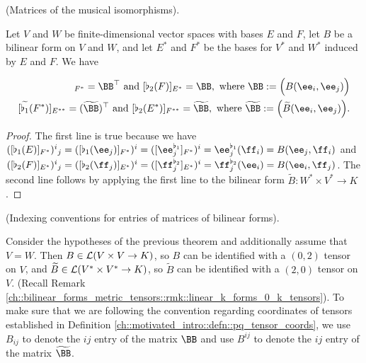 \begin{theorem}
\label{ch::bilinear_forms_metric_tensors::thm::matrices_musical_isos}
    (Matrices of the musical isomorphisms).
    
    Let $V$ and $W$ be finite-dimensional vector spaces with bases $E$ and $F$, let $B$ be a bilinear form on $V$ and $W$, and let $E^*$ and $F^*$ be the bases for $V^*$ and $W^*$ induced by $E$ and $F$. We have

    \begin{align*}
        [\flat_1(E)]_{F^*} = \BB^\top \text{ and } [\flat_2(F)]_{E^*} = \BB, \text{ where $\BB := \Big(B(\ee_i, \ee_j)\Big)$} \\
        [\widetilde{\flat_1}(F^*)]_{E^{**}} = (\widetilde{\BB})^\top \text{ and } [\flat_2(E^*)]_{F^{**}} = \widetilde{\BB}, \text{ where $\widetilde{\BB} := \Big(\widetilde{B}(\ee_i, \ee_j)\Big)$}. 
    \end{align*}
\end{theorem}

\begin{proof}
    The first line is true because we have $([\flat_1(E)]_{F^*})^i{}_j = ([\flat_1(\ee_j)]_{F^*})^i = ([\ee_j^{\flat_1}]_{F^*})^i = \ee_j^{\flat_1}(\ff_i) = B(\ee_j, \ff_i)$ and \\ $([\flat_2(F)]_{E^*})^i{}_j = ([\flat_2(\ff_j)]_{E^*})^i = ([\ff_j^{\flat_2}]_{E^*})^i = \ff_j^{\flat_2}(\ee_i) = B(\ee_i, \ff_j)$. The second line follows by applying the first line to the bilinear form $\widetilde{B}:W^* \times V^* \rightarrow K$.
\end{proof}
 
\begin{remark}
    (Indexing conventions for entries of matrices of bilinear forms).
    
    Consider the hypotheses of the previous theorem and additionally assume that $V = W$. Then ${B \in \mathcal{L}(V \times V \rightarrow K)}$, so $B$ can be identified with a $(0, 2)$ tensor on $V$, and $\widetilde{B} \in \mathcal{L}(V^* \times V^* \rightarrow K)$, so $\widetilde{B}$ can be identified with a $(2, 0)$ tensor on $V$. (Recall Remark \ref{ch::bilinear_forms_metric_tensors::rmk::linear_k_forms_0_k_tensors}). To make sure that we are following the convention regarding coordinates of tensors established in Definition \ref{ch::motivated_intro::defn::pq_tensor_coords}, we use $B_{ij}$ to denote the $ij$ entry of the matrix $\BB$ and use $B^{ij}$ to denote the $ij$ entry of the matrix $\widetilde{\BB}$.
\end{remark}
 
